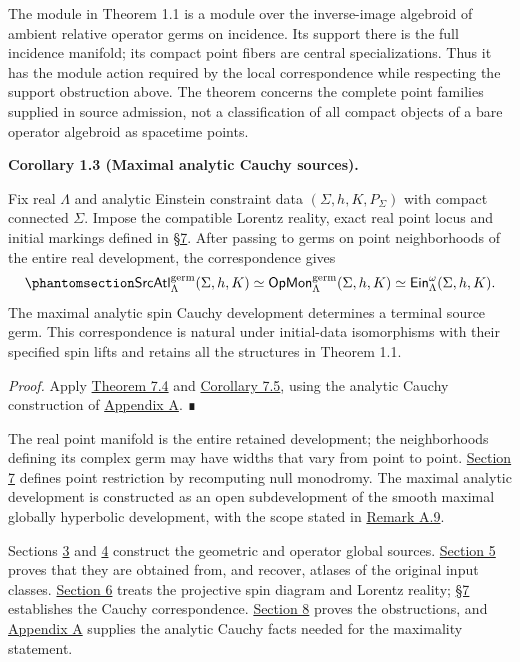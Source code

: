 \documentclass[
  english,
  11pt,
  reqno]{amsart}
\makeatletter
\newcommand{\pandocstatementheading}[1]{%
  \par\addpenalty{\@beginparpenalty}%
  \addvspace{.5\baselineskip plus .2\baselineskip minus .2\baselineskip}%
  {\normalfont\bfseries #1\par}%
  \nobreak\@afterindenttrue\@afterheading
}
\makeatother
\begin{document}
The module in Theorem 1.1 is a module over the inverse-image algebroid
of ambient relative operator germs on incidence. Its support there is
the full incidence manifold; its compact point fibers are central
specializations. Thus it has the module action required by the local
correspondence while respecting the support obstruction above. The
theorem concerns the complete point families supplied in source
admission, not a classification of all compact objects of a bare
operator algebroid as spacetime points.

\pandocstatementheading{\protect{}\label{cor:focused-maximal-cauchy-source-v08}Corollary 1.3 (Maximal analytic Cauchy sources).}

Fix real \(\Lambda\) and analytic Einstein constraint data
\((\Sigma,h,K,P_\Sigma)\) with compact connected \(\Sigma\). Impose the
compatible Lorentz reality, exact real point locus and initial markings
defined in \hyperref[sec:germ-correspondence-v08]{§7}. After passing to
germs on point neighborhoods of the entire real development, the
correspondence gives
\begin{equation}\protect\phantomsection\label{eq:focused-cauchy-correspondence-v08}{
\mathsf{SrcAtl}^{\mathrm{germ}}_\Lambda(\Sigma,h,K)
\simeq
\mathsf{OpMon}^{\mathrm{germ}}_\Lambda(\Sigma,h,K)
\simeq
\mathsf{Ein}^{\omega}_\Lambda(\Sigma,h,K).
}\end{equation} The maximal analytic spin Cauchy development determines
a terminal source germ. This correspondence is natural under
initial-data isomorphisms with their specified spin lifts and retains
all the structures in Theorem 1.1.

\emph{Proof.} Apply
\hyperref[thm:source-atlas-cauchy-equivalence-v08]{Theorem 7.4} and
\hyperref[cor:maximal-source-atlas-germ-v08]{Corollary 7.5}, using the
analytic Cauchy construction of
\hyperref[sec:analytic-cauchy-appendix-v08]{Appendix A}. ∎

The real point manifold is the entire retained development; the
neighborhoods defining its complex germ may have widths that vary from
point to point. \hyperref[sec:germ-correspondence-v08]{Section 7}
defines point restriction by recomputing null monodromy. The maximal
analytic development is constructed as an open subdevelopment of the
smooth maximal globally hyperbolic development, with the scope stated in
\hyperref[rem:analytic-maximality-scope]{Remark A.9}.

Sections \hyperref[sec:global-null-monodromy-v08]{3} and
\hyperref[sec:operator-incidence-v08]{4} construct the geometric and
operator global sources.
\hyperref[sec:original-source-atlases-v08]{Section 5} proves that they
are obtained from, and recover, atlases of the original input classes.
\hyperref[sec:spin-reality-v08]{Section 6} treats the projective spin
diagram and Lorentz reality; \hyperref[sec:germ-correspondence-v08]{§7}
establishes the Cauchy correspondence.
\hyperref[sec:nariai-obstructions-v08]{Section 8} proves the
obstructions, and \hyperref[sec:analytic-cauchy-appendix-v08]{Appendix
A} supplies the analytic Cauchy facts needed for the maximality
statement.
\end{document}
